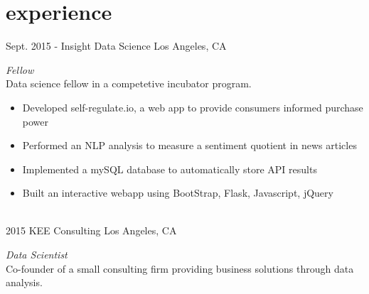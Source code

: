 \documentclass[]{friggeri-cv} %
\begin{document}
\section{experience}
\begin{entrylist}

\entry
{Sept. 2015 -}
{Insight Data Science}
{Los Angeles, CA}
{\emph{Fellow}\\
Data science fellow in a competetive incubator program. 

\begin{itemize}
  \item Developed self-regulate.io, a web app to provide consumers informed purchase power  
  \item Performed an NLP analysis to measure a sentiment quotient in news articles 
  \item Implemented a mySQL database to automatically store API results 
  \item Built an interactive webapp using BootStrap, Flask, Javascript, jQuery
\end{itemize}
}

~\\
\entry
{2015}
{KEE Consulting}
{Los Angeles, CA}
{\emph{Data Scientist}\\
Co-founder of a small consulting firm providing 
business solutions through data analysis. 

}
\end{entrylist}
\end{document}
